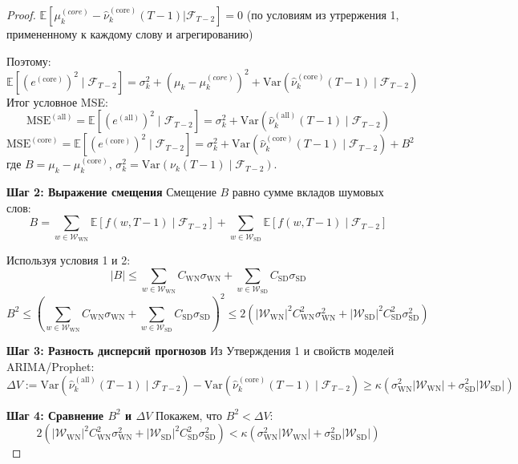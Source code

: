 \documentclass[14pt,a4paper]{article}
\begin{document}
\begin{proof}
\(\mathbb{E}[\mu_k^{(core)} - \widehat{\nu}_k^{(\mathrm{core})}(T-1) | \mathcal{F}_{T-2}] = 0\)   (по условиям из утрержения 1, примененному к каждому слову и агрегированию)

Поэтому:
\(
\mathbb{E}[(e^{(\mathrm{core})})^2 \mid \mathcal{F}_{T-2}]
= \sigma_k^2 + (\mu_k - \mu_k^{(core)})^2 + \text{Var}(\widehat{\nu}_k^{(\mathrm{core})}(T-1) \mid \mathcal{F}_{T-2})
\)
Итог условное MSE:
\[
\mathrm{MSE}^{(\mathrm{all})} = \mathbb{E} \left[ \left( e^{(\mathrm{all})} \right)^2 \mid \mathcal{F}_{T-2} \right] = \sigma_k^2 + \mathrm{Var}\left( \widehat{\nu}_k^{(\mathrm{all})}(T-1) \mid \mathcal{F}_{T-2} \right)
\]
\[
\mathrm{MSE}^{(\mathrm{core})} = \mathbb{E} \left[ \left( e^{(\mathrm{core})} \right)^2 \mid \mathcal{F}_{T-2} \right] = \sigma_k^2 + \mathrm{Var}\left( \widehat{\nu}_k^{(\mathrm{core})}(T-1) \mid \mathcal{F}_{T-2} \right) + B^2
\]
где $B = \mu_k - \mu_k^{(\mathrm{core})}$, $\sigma_k^2 = \mathrm{Var}(\nu_k(T-1) \mid \mathcal{F}_{T-2})$.

\textbf{Шаг 2: Выражение смещения}
Смещение $B$ равно сумме вкладов шумовых слов:
\[
B = \sum_{w \in \mathcal{W}_{\mathrm{WN}}} \mathbb{E}[f(w,T-1) \mid \mathcal{F}_{T-2}] + \sum_{w \in \mathcal{W}_{\mathrm{SD}}} \mathbb{E}[f(w,T-1) \mid \mathcal{F}_{T-2}]
\]

Используя условия 1 и 2:
\[
|B| \leq \sum_{w \in \mathcal{W}_{\mathrm{WN}}} C_{\mathrm{WN}} \sigma_{\mathrm{WN}} + \sum_{w \in \mathcal{W}_{\mathrm{SD}}} C_{\mathrm{SD}} \sigma_{\mathrm{SD}}
\]
\[
B^2 \leq \left( \sum_{w \in \mathcal{W}_{\mathrm{WN}}} C_{\mathrm{WN}} \sigma_{\mathrm{WN}} + \sum_{w \in \mathcal{W}_{\mathrm{SD}}} C_{\mathrm{SD}} \sigma_{\mathrm{SD}} \right)^2 \leq 2 \left( |\mathcal{W}_{\mathrm{WN}}|^2 C_{\mathrm{WN}}^2 \sigma_{\mathrm{WN}}^2 + |\mathcal{W}_{\mathrm{SD}}|^2 C_{\mathrm{SD}}^2 \sigma_{\mathrm{SD}}^2 \right)
\]

\textbf{Шаг 3: Разность дисперсий прогнозов}
Из Утверждения 1 и свойств моделей ARIMA/Prophet:
\(
\Delta V := \mathrm{Var}\left( \widehat{\nu}_k^{(\mathrm{all})}(T-1) \mid \mathcal{F}_{T-2} \right) - \mathrm{Var}\left( \widehat{\nu}_k^{(\mathrm{core})}(T-1) \mid \mathcal{F}_{T-2} \right) \geq \kappa \left( \sigma_{\mathrm{WN}}^2 |\mathcal{W}_{\mathrm{WN}}| + \sigma_{\mathrm{SD}}^2 |\mathcal{W}_{\mathrm{SD}}| \right)
\)

\textbf{Шаг 4: Сравнение $B^2$ и $\Delta V$}
Покажем, что $B^2 < \Delta V$:
\[
2 \left( |\mathcal{W}_{\mathrm{WN}}|^2 C_{\mathrm{WN}}^2 \sigma_{\mathrm{WN}}^2 + |\mathcal{W}_{\mathrm{SD}}|^2 C_{\mathrm{SD}}^2 \sigma_{\mathrm{SD}}^2 \right) < \kappa \left( \sigma_{\mathrm{WN}}^2 |\mathcal{W}_{\mathrm{WN}}| + \sigma_{\mathrm{SD}}^2 |\mathcal{W}_{\mathrm{SD}}| \right)
\]


\end{proof}
\end{document}

